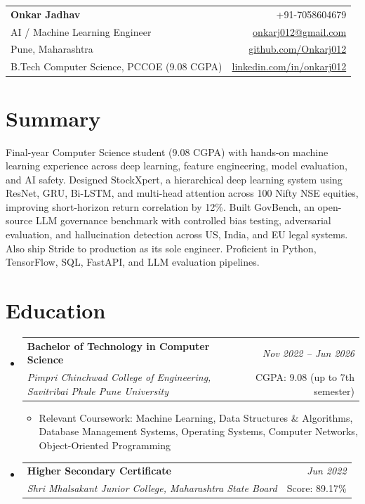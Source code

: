 \documentclass[a4paper,11pt]{article}
\makeatletter
\newcommand{\resumeSubheading}[4]{
\vspace{0.5mm}\item
    \begin{tabular*}{0.98\textwidth}[t]{l@{\extracolsep{\fill}}r}
        \textbf{#1} & \textit{\footnotesize{#4}} \\
        \textit{\footnotesize{#3}} & \footnotesize{#2}\\
    \end{tabular*}
    \vspace{-2.4mm}
}
\newcommand{\resumeSubHeadingListStart}{\begin{itemize}[leftmargin=*,labelsep=0mm]}
\newcommand{\resumeItemListStart}{\begin{justify}\begin{itemize}[leftmargin=3ex, rightmargin=2ex, noitemsep,labelsep=1.2mm,itemsep=0mm]\small}
\newcommand{\resumeSubHeadingListEnd}{\end{itemize}\vspace{2mm}}
\newcommand{\resumeItemListEnd}{\end{itemize}\end{justify}\vspace{-2mm}}
\newcommand{\name}{Onkar Jadhav}
\newcommand{\phone}{7058604679}
\newcommand{\emaila}{onkarj012@gmail.com}
\newcommand{\github}{github.com/Onkarj012}
\newcommand{\linkedin}{linkedin.com/in/onkarj012}
\makeatother
\begin{document}
\selectfont

\begin{tabularx}{\linewidth}{L r}
  \textbf{\Large \name} & {+91-\phone}\\
  {AI / Machine Learning Engineer} & \href{mailto:\emaila}{\emaila} \\
  {Pune, Maharashtra} & \href{https://\github}{\github} \\
  {B.Tech Computer Science, PCCOE (9.08 CGPA)} & \href{https://\linkedin}{\linkedin}
\end{tabularx}
\vspace{-4mm}

\section{\textbf{Summary}}
\vspace{1mm}
\small{
Final-year Computer Science student (9.08 CGPA) with hands-on machine learning experience across deep learning, feature engineering, model evaluation, and AI safety. Designed StockXpert, a hierarchical deep learning system using ResNet, GRU, Bi-LSTM, and multi-head attention across 100 Nifty NSE equities, improving short-horizon return correlation by 12\%. Built GovBench, an open-source LLM governance benchmark with controlled bias testing, adversarial evaluation, and hallucination detection across US, India, and EU legal systems. Also ship Stride to production as its sole engineer. Proficient in Python, TensorFlow, SQL, FastAPI, and LLM evaluation pipelines.
}
\vspace{-3mm}

\section{\textbf{Education}}
  \resumeSubHeadingListStart
    \resumeSubheading
      {Bachelor of Technology in Computer Science}{CGPA: 9.08 (up to 7th semester)}
      {Pimpri Chinchwad College of Engineering, Savitribai Phule Pune University}{Nov 2022 -- Jun 2026}
      \resumeItemListStart
        \item {Relevant Coursework: Machine Learning, Data Structures \& Algorithms, Database Management Systems, Operating Systems, Computer Networks, Object-Oriented Programming}
      \resumeItemListEnd
    \resumeSubheading
      {Higher Secondary Certificate}{Score: 89.17\%}
      {Shri Mhalsakant Junior College, Maharashtra State Board}{Jun 2022}
  \resumeSubHeadingListEnd
\vspace{-5.5mm}
\end{document}
